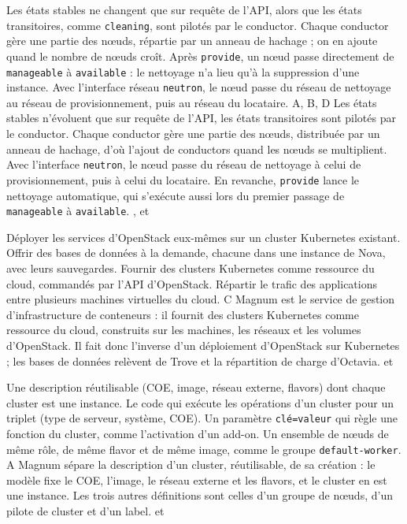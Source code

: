   {Les états stables ne changent que sur requête de l'API, alors que les états transitoires, comme \texttt{cleaning}, sont pilotés par le conductor.}
  {Chaque conductor gère une partie des nœuds, répartie par un anneau de hachage ; on en ajoute quand le nombre de nœuds croît.}
  {Après \texttt{provide}, un nœud passe directement de \texttt{manageable} à \texttt{available} : le nettoyage n'a lieu qu'à la suppression d'une instance.}
  {Avec l'interface réseau \texttt{neutron}, le nœud passe du réseau de nettoyage au réseau de provisionnement, puis au réseau du locataire.}
  {A, B, D}
  {Les états stables n'évoluent que sur requête de l'API, les états transitoires sont pilotés par le conductor. Chaque conductor gère une partie des nœuds, distribuée par un anneau de hachage, d'où l'ajout de conductors quand les nœuds se multiplient. Avec l'interface \texttt{neutron}, le nœud passe du réseau de nettoyage à celui de provisionnement, puis à celui du locataire. En revanche, \texttt{provide} lance le nettoyage automatique, qui s'exécute aussi lors du premier passage de \texttt{manageable} à \texttt{available}.}
  {,  et }


  {Déployer les services d'OpenStack eux-mêmes sur un cluster Kubernetes existant.}
  {Offrir des bases de données à la demande, chacune dans une instance de Nova, avec leurs sauvegardes.}
  {Fournir des clusters Kubernetes comme ressource du cloud, commandés par l'API d'OpenStack.}
  {Répartir le trafic des applications entre plusieurs machines virtuelles du cloud.}
  {C}
  {Magnum est le service de gestion d'infrastructure de conteneurs : il fournit des clusters Kubernetes comme ressource du cloud, construits sur les machines, les réseaux et les volumes d'OpenStack. Il fait donc l'inverse d'un déploiement d'OpenStack sur Kubernetes ; les bases de données relèvent de Trove et la répartition de charge d'Octavia.}
  { et }

  {Une description réutilisable (COE, image, réseau externe, flavors) dont chaque cluster est une instance.}
  {Le code qui exécute les opérations d'un cluster pour un triplet (type de serveur, système, COE).}
  {Un paramètre \texttt{clé=valeur} qui règle une fonction du cluster, comme l'activation d'un add-on.}
  {Un ensemble de nœuds de même rôle, de même flavor et de même image, comme le groupe \texttt{default-worker}.}
  {A}
  {Magnum sépare la description d'un cluster, réutilisable, de sa création : le modèle fixe le COE, l'image, le réseau externe et les flavors, et le cluster en est une instance. Les trois autres définitions sont celles d'un groupe de nœuds, d'un pilote de cluster et d'un label.}
  { et }

